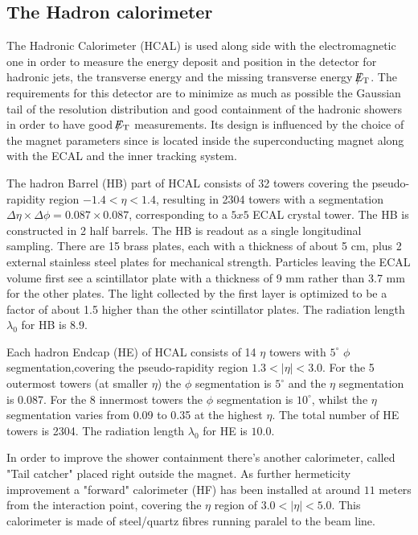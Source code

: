 \subsection{The Hadron calorimeter}

The Hadronic Calorimeter (HCAL) is used along side with the electromagnetic one in order to measure the energy deposit and position in the detector for hadronic jets, the transverse energy and the missing transverse energy $\slash\mkern-12mu{E}_{\text{T}}$. The requirements for this detector are to minimize as much as possible the Gaussian tail of the resolution distribution and good containment of the hadronic showers in order to have good $\slash\mkern-12mu{E}_{\text{T}}$ measurements. Its design is influenced by the choice of the magnet parameters since is located inside the superconducting magnet along with the ECAL and the inner tracking system. 

The hadron Barrel (HB) part of HCAL consists of 32 towers covering the pseudo-rapidity region $−1.4 < \eta < 1.4$, resulting in 2304 towers with a segmentation $\Delta\eta\times\Delta\phi = 0.087\times0.087$, corresponding to a $5x5$ ECAL crystal tower. The HB is constructed in 2 half barrels. The HB is readout as a single longitudinal sampling. There are 15 brass plates, each with a thickness of about 5 cm, plus 2 external stainless steel plates for mechanical strength. Particles leaving the ECAL volume ﬁrst see a scintillator plate with a thickness of 9 mm rather than 3.7 mm for the other plates. The light collected by the ﬁrst layer is optimized to be a factor of about 1.5 higher than the other scintillator plates. The radiation length $\lambda_{0}$ for HB is $8.9$.

Each hadron Endcap (HE) of HCAL consists of 14 $\eta$ towers with $5^{\circ}$ $\phi$ segmentation,covering the pseudo-rapidity region $1.3 < |\eta| < 3.0$. For the 5 outermost towers (at smaller $\eta$) the $\phi$ segmentation is $5^{\circ}$ and the $\eta$ segmentation is 0.087. For the 8 innermost towers the $\phi$ segmentation is $10^{\circ}$, whilst the $\eta$ segmentation varies from 0.09 to 0.35 at the highest $\eta$. The total number of HE towers is 2304. The radiation length $\lambda_{0}$ for HE is $10.0$.

In order to improve the shower containment there's another calorimeter, called "Tail catcher" placed right outside the magnet. As further hermeticity improvement a "forward" calorimeter (HF) has been installed at around $11$ meters from the interaction point, covering the $\eta$ region of $3.0 < |\eta| <5.0$. This calorimeter is made of steel/quartz fibres running paralel to the beam line.

